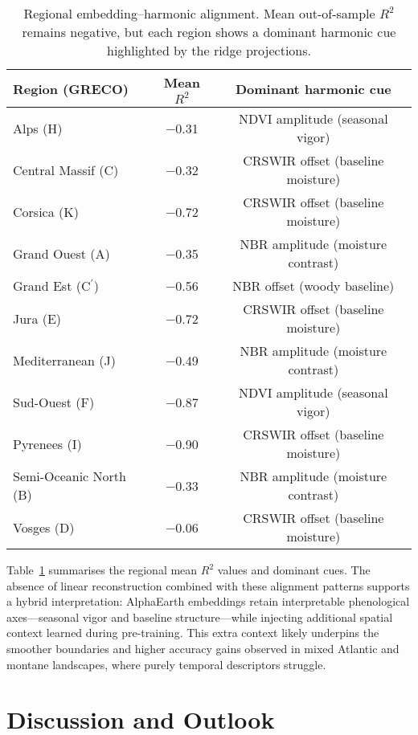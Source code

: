 \documentclass[utf8]{FrontiersinHarvard}
\begin{document}
\begin{table}[H]
    \centering
    \small
    \begin{tabular}{lcc}
        \toprule
        \textbf{Region (GRECO)} & \textbf{Mean $R^2$} & \textbf{Dominant harmonic cue} \\
        \midrule
        Alps (H) & −0.31 & NDVI amplitude (seasonal vigor) \\
        Central Massif (C) & −0.32 & CRSWIR offset (baseline moisture) \\
        Corsica (K) & −0.72 & CRSWIR offset (baseline moisture) \\
        Grand Ouest (A) & −0.35 & NBR amplitude (moisture contrast) \\
        Grand Est (C$^\prime$) & −0.56 & NBR offset (woody baseline) \\
        Jura (E) & −0.72 & CRSWIR offset (baseline moisture) \\
        Mediterranean (J) & −0.49 & NBR amplitude (moisture contrast) \\
        Sud-Ouest (F) & −0.87 & NDVI amplitude (seasonal vigor) \\
        Pyrenees (I) & −0.90 & CRSWIR offset (baseline moisture) \\
        Semi-Oceanic North (B) & −0.33 & NBR amplitude (moisture contrast) \\
        Vosges (D) & −0.06 & CRSWIR offset (baseline moisture) \\
        \bottomrule
    \end{tabular}
    \caption{Regional embedding–harmonic alignment. Mean out-of-sample \(R^2\) remains negative, but each region shows a dominant harmonic cue highlighted by the ridge projections.}
    \label{tab:similarity_summary}
\end{table}

Table~\ref{tab:similarity_summary} summarises the regional mean $R^2$ values and dominant cues. The absence of linear reconstruction combined with these alignment patterns supports a hybrid interpretation: AlphaEarth embeddings retain interpretable phenological axes—seasonal vigor and baseline structure—while injecting additional spatial context learned during pre-training. This extra context likely underpins the smoother boundaries and higher accuracy gains observed in mixed Atlantic and montane landscapes, where purely temporal descriptors struggle.

\section{Discussion and Outlook}
\end{document}
